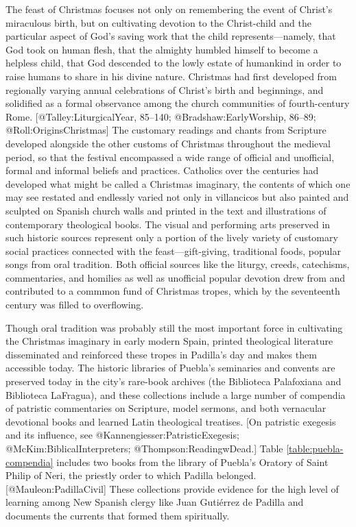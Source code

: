 The feast of Christmas focuses not only on remembering the event of Christ's
miraculous birth, but on cultivating devotion to the Christ-child and the
particular aspect of God's saving work that the child represents---namely, that
God took on human flesh, that the almighty humbled himself to become a helpless
child, that God descended to the lowly estate of humankind in order to raise
humans to share in his divine nature.
Christmas had first developed from regionally varying annual celebrations of
Christ's birth and beginnings, and solidified as a formal observance among the
church communities of fourth-century Rome.
[@Talley:LiturgicalYear, 85--140; @Bradshaw:EarlyWorship, 86--89;
@Roll:OriginsChristmas]
The customary readings and chants from Scripture developed alongside the other
customs of Christmas throughout the medieval period, so that the festival
encompassed a wide range of official and unofficial, formal and informal beliefs
and practices.
Catholics over the centuries had developed what might be called a Christmas
imaginary, the contents of which one may see restated and endlessly varied not
only in villancicos but also painted and sculpted on Spanish church walls and
printed in the text and illustrations of contemporary theological books.
The visual and performing arts preserved in such historic sources represent only
a portion of the lively variety of customary social practices connected with the
feast---gift-giving, traditional foods, popular songs from oral tradition.
Both official sources like the liturgy, creeds, catechisms, commentaries, and
homilies as well as unofficial popular devotion drew from and contributed to a
commmon fund of Christmas tropes, which by the seventeenth century was filled to
overflowing.

Though oral tradition was probably still the most important force in cultivating
the Christmas imaginary in early modern Spain, printed theological literature
disseminated and reinforced these tropes in Padilla's day and makes them
accessible today.
The historic libraries of Puebla's seminaries and convents are preserved today
in the city's rare-book archives (the Biblioteca Palafoxiana and Biblioteca
LaFragua), and these collections include a large number of compendia of
patristic commentaries on Scripture, model sermons, and both vernacular
devotional books and learned Latin theological treatises.
[On patristic exegesis and its influence, see @Kannengiesser:PatristicExegesis;
@McKim:BiblicalInterpreters; @Thompson:ReadingwDead.]
Table \ref{table:puebla-compendia} includes two books from the library of
Puebla's Oratory of Saint Philip of Neri, the priestly order to which Padilla
belonged.
[@Mauleon:PadillaCivil]
These collections provide evidence for the high level of learning among New
Spanish clergy like Juan Gutiérrez de Padilla and documents the currents that
formed them spiritually.

